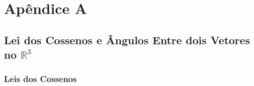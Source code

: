 \documentclass[a4paper,12pt]{article}
\begin{document}
	
	
	
	
	\newpage
	
	\section*{Apêndice A}
	\subsection*{Lei dos Cossenos e Ângulos Entre dois Vetores no $\mathbb{R}^3$}
	
	\subsubsection*{Leis dos Cossenos}
\end{document}

